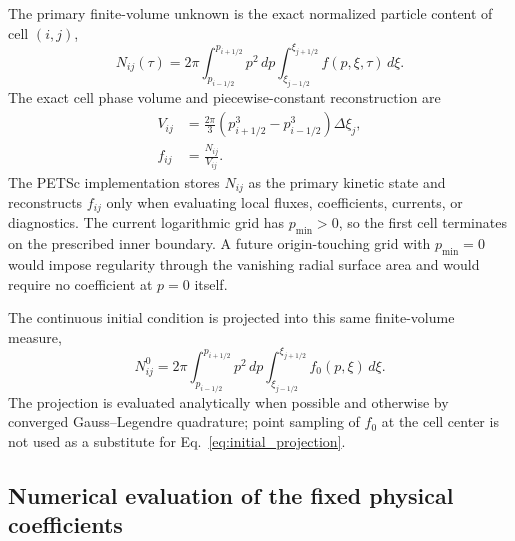 \documentclass[11pt]{article}
\begin{document}
The primary finite-volume unknown is the exact normalized particle content of cell
$(i,j)$,
\begin{equation}
 N_{ij}(\tau)
 =2\pi\int_{p_{i-1/2}}^{p_{i+1/2}}p^2\,dp
       \int_{\xi_{j-1/2}}^{\xi_{j+1/2}}f(p,\xi,\tau)\,d\xi.
 \label{eq:cellcontent}
\end{equation}
The exact cell phase volume and piecewise-constant reconstruction are
\begin{align}
 V_{ij}
 &=\frac{2\pi}{3}
   \left(p_{i+1/2}^3-p_{i-1/2}^3\right)
   \Delta\xi_j,
 \label{eq:cellvolume}\\
 f_{ij}&=\frac{N_{ij}}{V_{ij}}.
 \label{eq:cell_reconstruction}
\end{align}
The PETSc implementation stores $N_{ij}$ as the primary kinetic state and reconstructs
$f_{ij}$ only when evaluating local fluxes, coefficients, currents, or diagnostics.
The current logarithmic grid has $p_{\min}>0$, so the first cell terminates on the
prescribed inner boundary.  A future origin-touching grid with $p_{\min}=0$ would impose
regularity through the vanishing radial surface area and would require no coefficient at
$p=0$ itself.

The continuous initial condition is projected into this same finite-volume measure,
\begin{equation}
 N_{ij}^{0}
 =2\pi\int_{p_{i-1/2}}^{p_{i+1/2}}p^2\,dp
       \int_{\xi_{j-1/2}}^{\xi_{j+1/2}}f_0(p,\xi)\,d\xi.
 \label{eq:initial_projection}
\end{equation}
The projection is evaluated analytically when possible and otherwise by converged
Gauss--Legendre quadrature; point sampling of $f_0$ at the cell center is not used as
a substitute for Eq.~\eqref{eq:initial_projection}.

\subsection{Numerical evaluation of the fixed physical coefficients}
\end{document}
